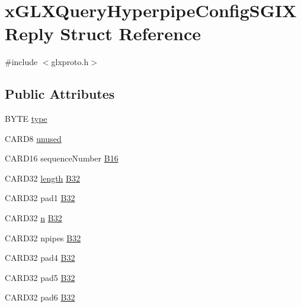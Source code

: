\hypertarget{structx_g_l_x_query_hyperpipe_config_s_g_i_x_reply}{}\section{x\+G\+L\+X\+Query\+Hyperpipe\+Config\+S\+G\+I\+X\+Reply Struct Reference}
\label{structx_g_l_x_query_hyperpipe_config_s_g_i_x_reply}


{\ttfamily \#include $<$glxproto.\+h$>$}

\subsection*{Public Attributes}
\begin{DoxyCompactItemize}
\item 
B\+Y\+TE \hyperlink{structx_g_l_x_query_hyperpipe_config_s_g_i_x_reply_a97bc87af35dbf5c694d1477db1e6ff99}{type}
\item 
C\+A\+R\+D8 \hyperlink{structx_g_l_x_query_hyperpipe_config_s_g_i_x_reply_ad209b2b7c98ecbdcac29a4b2273a5fa7}{unused}
\item 
C\+A\+R\+D16 sequence\+Number \hyperlink{structx_g_l_x_query_hyperpipe_config_s_g_i_x_reply_a63f0f31fb37054f170242c8c2e04007e}{B16}
\item 
C\+A\+R\+D32 \hyperlink{glcorearb_8h_ab9c919755bde3b34349e23a32b4e0fa7}{length} \hyperlink{structx_g_l_x_query_hyperpipe_config_s_g_i_x_reply_a454c525f81cdd3fa94f5d6ebe5576fe0}{B32}
\item 
C\+A\+R\+D32 pad1 \hyperlink{structx_g_l_x_query_hyperpipe_config_s_g_i_x_reply_a1fd5b3b0be01230d304c071ecc67646e}{B32}
\item 
C\+A\+R\+D32 \hyperlink{glcorearb_8h_ae2b4646468bc89d0ba646f5cf838e051}{n} \hyperlink{structx_g_l_x_query_hyperpipe_config_s_g_i_x_reply_abab56f63e63a2e2e14269931ab4bc7e4}{B32}
\item 
C\+A\+R\+D32 npipes \hyperlink{structx_g_l_x_query_hyperpipe_config_s_g_i_x_reply_a4740e9758d05d72b9b7d2053ad0e453a}{B32}
\item 
C\+A\+R\+D32 pad4 \hyperlink{structx_g_l_x_query_hyperpipe_config_s_g_i_x_reply_a704c89484de36a5c71129ab01fd289f8}{B32}
\item 
C\+A\+R\+D32 pad5 \hyperlink{structx_g_l_x_query_hyperpipe_config_s_g_i_x_reply_a5ce9361457cd70427be57408086ca706}{B32}
\item 
C\+A\+R\+D32 pad6 \hyperlink{structx_g_l_x_query_hyperpipe_config_s_g_i_x_reply_abccd64d0a4740d8901772b4767510ffc}{B32}
\end{DoxyCompactItemize}



